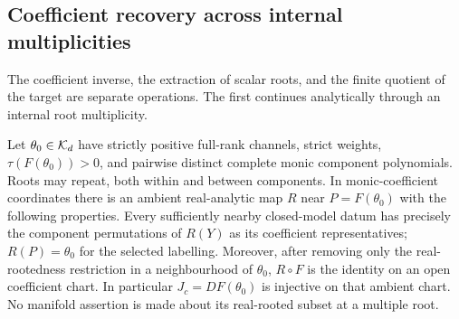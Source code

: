 \subsection{Coefficient recovery across internal multiplicities}
\label{sec:coefficient-recovery}
The coefficient inverse, the extraction of scalar roots, and the
finite quotient of the target are separate operations. The first
continues analytically through an internal root multiplicity.

\begin{proposition}\label{prop:coefficient-recovery}
Let $\theta_0\in\mathcal K_d$ have strictly positive full-rank channels,
strict weights, $\tau(F(\theta_0))>0$, and pairwise distinct complete
monic component polynomials. Roots may repeat, both within and between
components. In monic-coefficient coordinates there is an ambient
real-analytic map $R$ near $P=F(\theta_0)$ with the following properties.
Every sufficiently nearby closed-model datum has precisely the
component permutations of $R(Y)$ as its coefficient representatives;
$R(P)=\theta_0$ for the selected labelling. Moreover, after removing
only the real-rootedness restriction in a neighbourhood of $\theta_0$,
$R\circ F$ is the identity on an open coefficient chart. In particular
$J_c=DF(\theta_0)$ is injective on that ambient chart. No manifold
assertion is made about its real-rooted subset at a multiple root.
\end{proposition}
